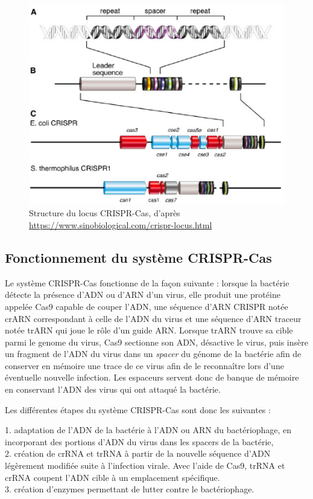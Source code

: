 \documentclass[twoside,a4paper,11pt,frenchb,openany]{report}
\begin{document}
\begin{figure}
\centering
\includegraphics[scale=0.6]{crispr.png}
\caption{Structure du locus CRISPR-Cas, d'après\\ \url{https://www.sinobiological.com/crispr-locus.html}}
\end{figure}


\subsection{Fonctionnement du système CRISPR-Cas}

Le système CRISPR-Cas fonctionne de la façon suivante : lorsque la bactérie détecte la présence d'ADN ou d'ARN d'un virus, elle produit une protéine appelée Cas9 capable de couper l'ADN, une séquence d'ARN CRISPR notée crARN correspondant à celle de l'ADN du virus et une séquence d'ARN traceur notée trARN qui joue le rôle d'un guide ARN. Lorsque trARN trouve sa cible parmi le genome du virus, Cas9 sectionne son ADN, désactive le virus, puis insère un fragment de l'ADN du virus dans un \textit{spacer} du génome de la bactérie afin de conserver en mémoire une trace de ce virus afin de le reconnaître lors d'une éventuelle nouvelle infection. Les espaceurs servent donc de banque de mémoire en conservant l'ADN des virus qui ont attaqué la bactérie.

Les différentes étapes du système CRISPR-Cas sont donc les suivantes :

1. adaptation de l'ADN de la bactérie à l'ADN ou ARN du bactériophage, en incorporant des portions d'ADN du virus dans les spacers de la bactérie,\\
2. création de crRNA et trRNA à partir de la nouvelle séquence d'ADN légèrement modifiée suite à l'infection virale. Avec l'aide de Cas9, trRNA et crRNA coupent l'ADN cible à un emplacement spécifique.\\
3. création d'enzymes permettant de lutter contre le bactériophage.
\end{document}
